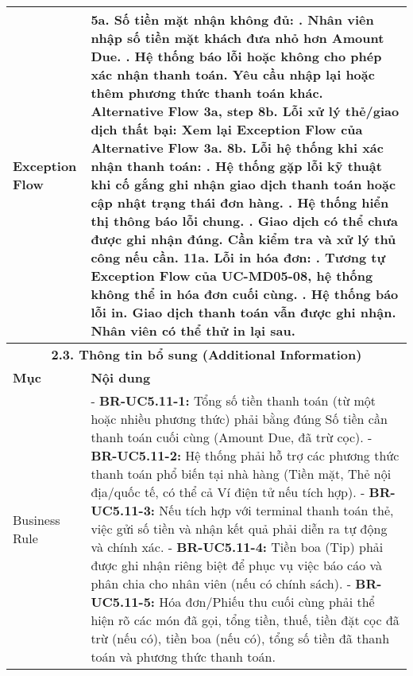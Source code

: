 \begin{longtable}{|m{4cm}|p{11cm}|}
\hline
Exception Flow & \textbf{5a. Số tiền mặt nhận không đủ:} \newline    1. Nhân viên nhập số tiền mặt khách đưa nhỏ hơn Amount Due. \newline    2. Hệ thống báo lỗi hoặc không cho phép xác nhận thanh toán. Yêu cầu nhập lại hoặc thêm phương thức thanh toán khác. \newline \textbf{Alternative Flow 3a, step 8b. Lỗi xử lý thẻ/giao dịch thất bại:} Xem lại Exception Flow của Alternative Flow 3a. \newline \textbf{8b. Lỗi hệ thống khi xác nhận thanh toán:} \newline    1. Hệ thống gặp lỗi kỹ thuật khi cố gắng ghi nhận giao dịch thanh toán hoặc cập nhật trạng thái đơn hàng. \newline    2. Hệ thống hiển thị thông báo lỗi chung. \newline    3. Giao dịch có thể chưa được ghi nhận đúng. Cần kiểm tra và xử lý thủ công nếu cần. \newline \textbf{11a. Lỗi in hóa đơn:} \newline    1. Tương tự Exception Flow của UC-MD05-08, hệ thống không thể in hóa đơn cuối cùng. \newline    2. Hệ thống báo lỗi in. Giao dịch thanh toán vẫn được ghi nhận. Nhân viên có thể thử in lại sau. \\
\hline
\multicolumn{2}{|c|}{\textbf{2.3. Thông tin bổ sung (Additional Information)}} \\
\hline
\textbf{Mục} & \textbf{Nội dung} \\
\hline
Business Rule & - \textbf{BR-UC5.11-1:} Tổng số tiền thanh toán (từ một hoặc nhiều phương thức) phải bằng đúng Số tiền cần thanh toán cuối cùng (Amount Due, đã trừ cọc). \newline - \textbf{BR-UC5.11-2:} Hệ thống phải hỗ trợ các phương thức thanh toán phổ biến tại nhà hàng (Tiền mặt, Thẻ nội địa/quốc tế, có thể cả Ví điện tử nếu tích hợp). \newline - \textbf{BR-UC5.11-3:} Nếu tích hợp với terminal thanh toán thẻ, việc gửi số tiền và nhận kết quả phải diễn ra tự động và chính xác. \newline - \textbf{BR-UC5.11-4:} Tiền boa (Tip) phải được ghi nhận riêng biệt để phục vụ việc báo cáo và phân chia cho nhân viên (nếu có chính sách). \newline - \textbf{BR-UC5.11-5:} Hóa đơn/Phiếu thu cuối cùng phải thể hiện rõ các món đã gọi, tổng tiền, thuế, tiền đặt cọc đã trừ (nếu có), tiền boa (nếu có), tổng số tiền đã thanh toán và phương thức thanh toán. \\

\end{longtable}
